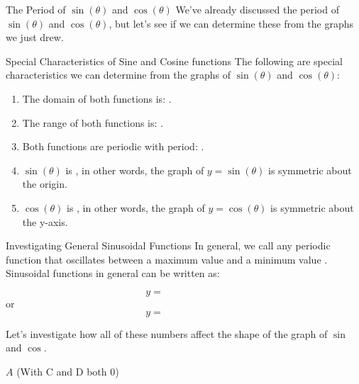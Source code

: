 \documentclass[presentation]{beamer}
\begin{document}
\begin{frame}[label={sec:orga33ecde}]{The Period of \(\sin(\theta)\) and \(\cos(\theta)\)}
We've already discussed the period of \(\sin(\theta)\) and
\(\cos(\theta)\), but let's see if we can determine these from the
graphs we just drew.
\end{frame}

\begin{frame}[label={sec:org3f59487}]{Special Characteristics of Sine and Cosine functions}
The following are special characteristics we can determine from the graphs of \(\sin(\theta)\) and \(\cos(\theta)\):

\begin{enumerate}
\item The domain of both functions is: \uline{\hspace*{1in}}.
\item The range of both functions is: \uline{\hspace*{1in}}.
\item Both functions are periodic with period: \uline{\hspace*{1in}}.
\item \(\sin(\theta)\) is \uline{\hspace*{1in}}, in other words, the graph of \(y = \sin(\theta)\) is symmetric about the origin.
\item \(\cos(\theta)\) is \uline{\hspace*{1in}}, in other words, the graph of \(y = \cos(\theta)\) is symmetric about the y-axis.
\end{enumerate}
\end{frame}

\begin{frame}[label={sec:org2835b6b}]{Investigating General Sinusoidal Functions}
In general, we call any periodic function that oscillates between a
maximum value and a minimum value \uline{\hspace*{1in}}.  Sinusoidal
functions in general can be written as:

\[y = \hspace{1in}\]
or
\[y = \hspace{1in}\]

Let's investigate how all of these numbers affect the shape of the
graph of \(\sin\) and \(\cos\).
\end{frame}

\begin{frame}[label={sec:org2a29113}]{\(A\) (With C and D both 0)}
\end{frame}
\end{document}
